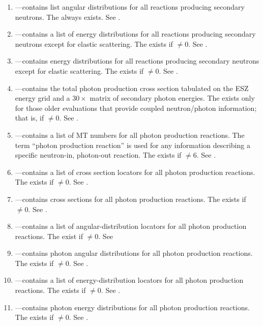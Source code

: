 \begin{enumerate}
  \item \textbf{}---contains list angular distributions for all reactions producing secondary neutrons. The  always exists. See .
  \item \textbf{}---contains a list of energy distributions for all reactions producing secondary neutrons except for elastic scattering. The  exists if $\neq0$. See .
  \item \textbf{}---contains energy distributions for all reactions producing secondary neutrons except for elastic scattering. The  exists if $\neq0$. See .
  \item \textbf{}---contains the total photon production cross section tabulated on the ESZ energy grid and a $30\times$ matrix of secondary photon energies. The  exists only for those older evaluations that provide coupled neutron/photon information; that is, if $\neq0$. See .
  \item \textbf{}---contains a list of MT numbers for all photon production reactions. The term ``photon production reaction'' is used for any information describing a specific neutron-in, photon-out reaction. The  exists if $\neq6$. See .
  \item \textbf{}---contains a list of cross section locators for all photon production reactions. The  exists if $\neq0$. See .
  \item \textbf{}---contains cross sections for all photon production reactions. The  exists if $\neq0$. See .
  \item \textbf{}---contains a list of angular-distribution locators for all photon production reactions. The  exist if $\neq0$. See 
  \item \textbf{}---contains photon angular distributions for all photon production reactions. The  exists if $\neq0$. See .
  \item \textbf{}---contains a list of energy-distribution locators for all photon production reactions. The  exists if $\neq0$. See .
  \item \textbf{}---contains photon energy distributions for all photon production reactions. The  exists if $\neq0$. See .

\end{enumerate}

